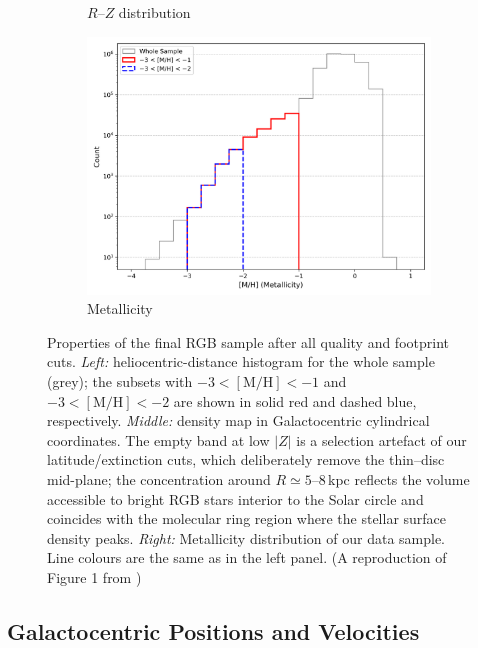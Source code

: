 \documentclass[a4paper,12pt]{article}
\begin{document}
\begin{figure}
\begin{subfigure}[b]{0.32\textwidth}
    \caption{$R$–$Z$ distribution}
    \label{fig:ZR_dist}
  \end{subfigure}\hfill
  \begin{subfigure}[b]{0.32\textwidth}
    \includegraphics[width=\textwidth]{../figures/metallicity_distribution.png}
    \caption{Metallicity}
    \label{fig:met_dist}
  \end{subfigure}

  \caption{Properties of the final RGB sample after all quality and footprint cuts.
           \textit{Left:} heliocentric-distance histogram for the whole sample (grey); the
           subsets with $-3<\mathrm{[M/H]}<-1$ and $-3<\mathrm{[M/H]}<-2$ are shown in
           solid red and dashed blue, respectively.  
           \textit{Middle:} density map in Galactocentric cylindrical coordinates.  
           The empty band at low $|Z|$ is a selection artefact of our
           latitude/extinction cuts, which deliberately remove the thin–disc mid-plane;
           the concentration around $R\!\simeq\!5$–$8$\,kpc reflects the volume
           accessible to bright RGB stars interior to the Solar circle and coincides
           with the molecular ring region where the stellar surface density peaks.  
           \textit{Right:} Metallicity distribution of our data sample. Line colours are the same as in the left panel.
           (A reproduction of Figure 1 from \citet{zhang2024existencemetalpoordiscmilky})}
  \label{fig:data_properties}
\end{figure}

\subsection{Galactocentric Positions and Velocities}
\label{subsec:velocities}
\end{document}
